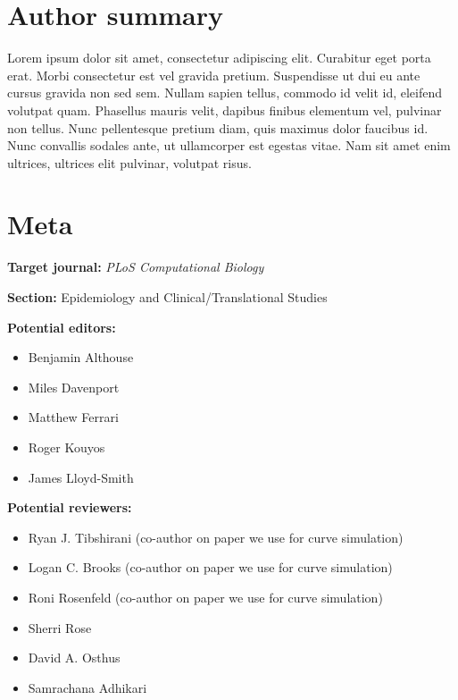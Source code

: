 \documentclass[10pt,letterpaper]{article}
\providecommand{\tightlist}{%
  \setlength{\itemsep}{0pt}\setlength{\parskip}{0pt}}
\begin{document}
\section*{Author summary}
Lorem ipsum dolor sit amet, consectetur adipiscing elit. Curabitur eget
porta erat. Morbi consectetur est vel gravida pretium. Suspendisse ut
dui eu ante cursus gravida non sed sem. Nullam sapien tellus, commodo id
velit id, eleifend volutpat quam. Phasellus mauris velit, dapibus
finibus elementum vel, pulvinar non tellus. Nunc pellentesque pretium
diam, quis maximus dolor faucibus id. Nunc convallis sodales ante, ut
ullamcorper est egestas vitae. Nam sit amet enim ultrices, ultrices elit
pulvinar, volutpat risus.

\linenumbers

\hypertarget{meta}{%
\section{Meta}\label{meta}}

\textbf{Target journal:} \emph{PLoS Computational Biology}

\noindent \textbf{Section:} Epidemiology and Clinical/Translational
Studies

\noindent \textbf{Potential editors:}

\begin{itemize}
\tightlist
\item
  Benjamin Althouse
\item
  Miles Davenport
\item
  Matthew Ferrari
\item
  Roger Kouyos
\item
  James Lloyd-Smith
\end{itemize}

\noindent \textbf{Potential reviewers:}

\begin{itemize}
\tightlist
\item
  Ryan J. Tibshirani (co-author on paper we use for curve simulation)
\item
  Logan C. Brooks (co-author on paper we use for curve simulation)
\item
  Roni Rosenfeld (co-author on paper we use for curve simulation)
\item
  Sherri Rose
\item
  David A. Osthus
\item
  Samrachana Adhikari
\end{itemize}
\end{document}
